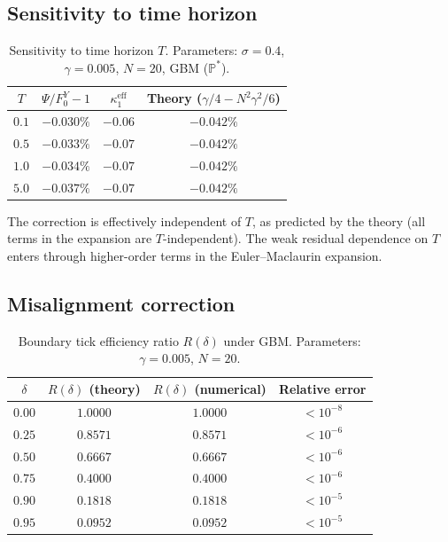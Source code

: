 \documentclass[11pt]{article}
\theoremstyle{definition}
\theoremstyle{remark}
\newcommand{\PP}{\mathbb{P}}
\begin{document}
\subsection{Sensitivity to time horizon}

\begin{table}[h]
\centering
\caption{Sensitivity to time horizon $T$. Parameters: $\sigma = 0.4$,
$\gamma = 0.005$, $N = 20$, GBM ($\PP^*$).}
\label{tab:T_sensitivity}
\begin{tabular}{cccc}
\toprule
$T$ & $\Psi/F_0^Y - 1$ & $\kappa_1^{\mathrm{eff}}$
& Theory ($\gamma/4 - N^2\gamma^2/6$) \\
\midrule
$0.1$ & $-0.030\%$ & $-0.06$ & $-0.042\%$ \\
$0.5$ & $-0.033\%$ & $-0.07$ & $-0.042\%$ \\
$1.0$ & $-0.034\%$ & $-0.07$ & $-0.042\%$ \\
$5.0$ & $-0.037\%$ & $-0.07$ & $-0.042\%$ \\
\bottomrule
\end{tabular}
\end{table}

The correction is effectively independent of $T$, as predicted by
the theory (all terms in the expansion are $T$-independent). The weak
residual dependence on $T$ enters through higher-order terms in the
Euler--Maclaurin expansion.

\subsection{Misalignment correction}

\begin{table}[h]
\centering
\caption{Boundary tick efficiency ratio $R(\delta)$ under GBM.
Parameters: $\gamma = 0.005$, $N = 20$.}
\label{tab:misalignment}
\begin{tabular}{cccc}
\toprule
$\delta$ & $R(\delta)$ (theory) & $R(\delta)$ (numerical)
& Relative error \\
\midrule
$0.00$ & $1.0000$ & $1.0000$ & $< 10^{-8}$ \\
$0.25$ & $0.8571$ & $0.8571$ & $< 10^{-6}$ \\
$0.50$ & $0.6667$ & $0.6667$ & $< 10^{-6}$ \\
$0.75$ & $0.4000$ & $0.4000$ & $< 10^{-6}$ \\
$0.90$ & $0.1818$ & $0.1818$ & $< 10^{-5}$ \\
$0.95$ & $0.0952$ & $0.0952$ & $< 10^{-5}$ \\
\bottomrule
\end{tabular}
\end{table}
\end{document}
